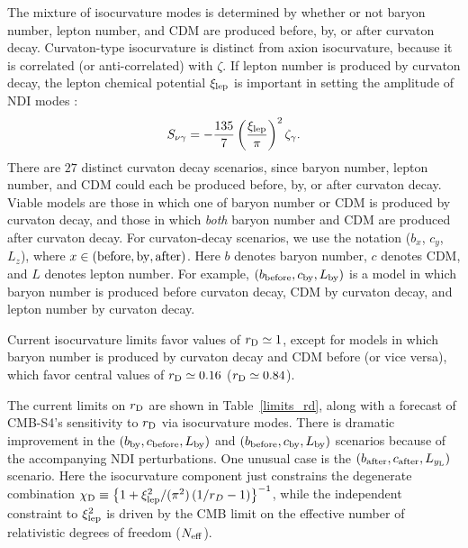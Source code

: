 The mixture of isocurvature modes is determined by whether or not baryon number, lepton number, and CDM are produced before, by, or after curvaton decay. Curvaton-type isocurvature is distinct from axion isocurvature, because it is correlated (or anti-correlated) with $\zeta$. If lepton number is produced by curvaton decay, the lepton chemical potential $\xi_{\rm lep}$ is important in setting the amplitude of NDI modes \cite{Lyth:2002my,Gordon:2003hw,DiValentino:2011sv}:
\begin{equation}
S_{\nu \gamma}=
-\frac{135}{7}\left(\frac{\xi_{\rm lep}}{\pi}\right)^2\zeta_{\gamma}.\end{equation}
There are $27$ distinct curvaton decay scenarios, since baryon number, lepton number, and CDM could each be produced before, by, or after curvaton decay. Viable models are those in which one of baryon number or CDM is produced by curvaton decay, and those in which \textit{both} baryon number and CDM are produced after curvaton decay. For curvaton-decay scenarios, we use the notation ($b_{x}$, $c_{y}$, $L_{z}$), where $x\in ({\rm before, by, after})$. Here $b$ denotes baryon number, $c$ denotes CDM, and $L$ denotes lepton number. For example, $(b_{\rm before}, c_{\rm by}, L_{\rm by})$ is a model in which baryon number is produced before curvaton decay, CDM by curvaton decay, and lepton number by curvaton decay.

Current isocurvature limits favor values of $r_{\rm D}\simeq 1$, except for models in which baryon number is produced by curvaton decay and CDM before (or vice versa), which favor central values of $r_{\rm D} \simeq 0.16$ ($r_{\rm D} \simeq 0.84$). 

The current limits \cite{Smith:2015bln} on $r_{\rm D}$ are shown in Table~\ref{limits_rd}, along with a forecast of CMB-S4's sensitivity to $r_{\rm D}$ via isocurvature modes. There is dramatic improvement in the $(b_{\rm by},c_{\rm before},L_{\rm by})$ and $(b_{\rm before},c_{\rm by},L_{\rm by})$ scenarios because of the accompanying NDI perturbations. One unusual case is the $(b_{\rm after},c_{\rm after}, L_{y_{\rm L}})$ scenario. Here the isocurvature component just constrains the degenerate combination \cite{Smith:2015bln} $\chi_{\rm D} \equiv \left\{1+\xi_{\rm lep}^2/(\pi^2) \left(1/r_D -1\right)\right\}^{-1}$, while the independent constraint to $\xi_{\rm lep}^{2}$ is driven by the CMB limit on the effective number of relativistic degrees of freedom ($N_{\rm eff}$).

